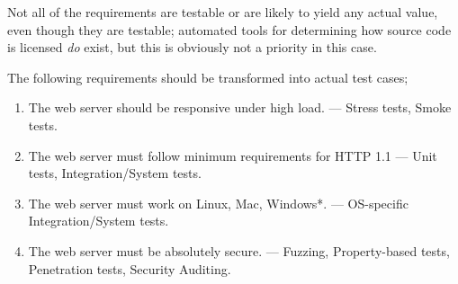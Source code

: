 Not all of the requirements are testable or are likely to yield any actual
value, even though they are testable; automated tools for determining how
source code is licensed \emph{do} exist, but this is obviously not a priority
in this case.

The following requirements should be transformed into actual test cases;
\begin{enumerate}
  \item The web server should be responsive under high load. --- Stress tests, Smoke tests.
  \item The web server must follow minimum requirements for HTTP 1.1 --- Unit tests, Integration/System tests.
  \item The web server must work on Linux, Mac, Windows*. --- OS-specific Integration/System tests.
  \item The web server must be absolutely secure. --- Fuzzing, Property-based tests, Penetration tests, Security Auditing.
\end{enumerate}

